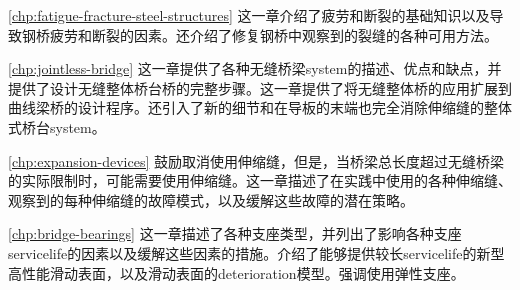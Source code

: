 \cref{chp:fatigue-fracture-steel-structures}  这一章介绍了疲劳和断裂的基础知识以及导致钢桥疲劳和断裂的因素。还介绍了修复钢桥中观察到的裂缝的各种可用方法。

\cref{chp:jointless-bridge}  这一章提供了各种无缝桥梁\gls{system}的描述、优点和缺点，并提供了设计无缝整体桥台桥的完整步骤。这一章提供了将无缝整体桥的应用扩展到曲线梁桥的设计程序。还引入了新的细节和在导板的末端也完全消除伸缩缝的整体式桥台\gls{system}。

\cref{chp:expansion-devices}  鼓励取消使用伸缩缝，但是，当桥梁总长度超过无缝桥梁的实际限制时，可能需要使用伸缩缝。这一章描述了在实践中使用的各种伸缩缝、观察到的每种伸缩缝的故障模式，以及缓解这些故障的潜在策略。

\cref{chp:bridge-bearings}  这一章描述了各种支座类型，并列出了影响各种支座\gls{servicelife}的因素以及缓解这些因素的措施。介绍了能够提供较长\gls{servicelife}的新型高性能滑动表面，以及滑动表面的\gls*{deterioration}模型。强调使用弹性支座。

